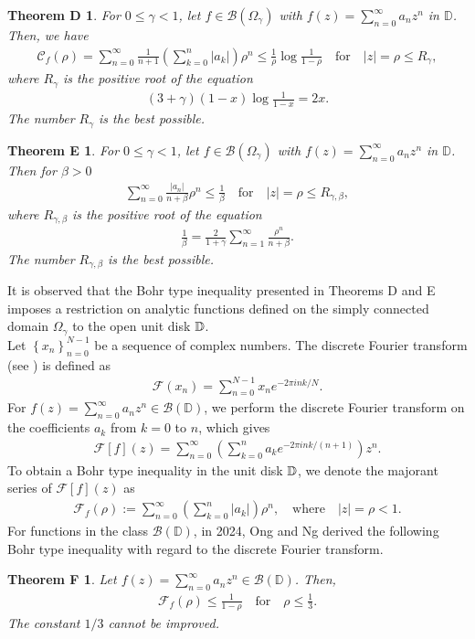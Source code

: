 \documentclass[11pt,reqno]{amsart}
\newtheorem*{theoD}{Theorem D}
\newtheorem*{theoE}{Theorem E}
\newtheorem*{theoF}{Theorem F}
\newtheorem{open problem}{Open problem}[section]
\newcommand{\beas}{\begin{eqnarray*}}
\newcommand{\eeas}{\end{eqnarray*}}
\numberwithin{equation}{section}
\begin{document}
\begin{theoD}\cite{5}
For $0\leq \gamma<1$, let  $f\in\mathcal{B}(\Omega_{\gamma})$ with $f(z)=\sum_{n=0}^\infty a_n z^n$ in $\mathbb{D}$. Then, we have 
\beas \mathcal{C}_f(\rho)=\sum_{n=0}^\infty \frac{1}{n+1}\left(\sum_{k=0}^n |a_k|\right) \rho^n\leq \frac{1}{\rho}\log\frac{1}{1-\rho}\quad\text{for}\quad |z|=\rho\leq R_\gamma,\eeas
where $R_\gamma$ is the positive root of the equation 
\beas (3+\gamma)(1-x)\log\frac{1}{1-x}=2x.\eeas 
The number $R_\gamma$ is the best possible. \end{theoD}
\begin{theoE}\cite{5}
For $0\leq \gamma<1$, let  $f\in\mathcal{B}(\Omega_{\gamma})$ with $f(z)=\sum_{n=0}^\infty a_n z^n$ in $\mathbb{D}$. Then for $\beta>0$
\beas \sum_{n=0}^\infty \frac{|a_n|}{n+\beta}\rho^n\leq \frac{1}{\beta}\quad\text{for}\quad |z|=\rho\leq R_{\gamma,\beta},\eeas
where $R_{\gamma,\beta}$ is the positive root of the equation 
\beas\frac{1}{\beta}=\frac{2}{1+\gamma}\sum_{n=1}^\infty \frac{\rho^n}{n+\beta}.\eeas 
The number $R_{\gamma,\beta}$ is the best possible.
\end{theoE}
It is observed that the Bohr type inequality presented in \textrm{Theorems D} and \textrm{E} imposes a restriction on analytic functions defined on the simply connected domain 
$\Omega_{\gamma}$ to the open unit disk $\Bbb{D}$.\\[2mm]
\indent Let $\left\{x_n\right\}_{n=0}^{N-1}$ be a sequence of complex numbers. The discrete Fourier transform (see \cite[Chapter 6]{100}) is defined as 
\beas \mathcal{F}(x_n)=\sum_{n=0}^{N-1} x_n e^{-2\pi i n k/N}. \eeas 
For $f(z)=\sum_{n=0}^\infty a_n z^n\in\mathcal{B}(\mathbb{D})$, we perform the discrete Fourier transform on the coefficients $a_k$ from $k=0$ to $n$, which gives
\beas \mathcal{F}[f](z)=\sum_{n=0}^\infty \left(\sum_{k=0}^n a_k e^{-2\pi i n k/(n+1)}\right) z^n.\eeas
To obtain a Bohr type inequality in the unit disk $\Bbb{D}$, we denote the majorant series of $\mathcal{F}[f](z)$ as
\beas \mathcal{F}_f(\rho):=\sum_{n=0}^\infty \left(\sum_{k=0}^n |a_k|\right) \rho^n, \quad\text{where}\quad |z|=\rho<1.\eeas
For functions in the class $\mathcal{B}(\mathbb{D})$, in 2024, Ong and Ng \cite{101} derived the following Bohr type inequality with regard to the discrete Fourier transform.
\begin{theoF}\cite{101}
Let $f(z)=\sum_{n=0}^\infty a_n z^n\in\mathcal{B}(\mathbb{D})$. Then, 
\beas \mathcal{F}_f(\rho)\leq \frac{1}{1-\rho}\quad\text{for}\quad \rho\leq \frac{1}{3}.\eeas
The constant $1/3$ cannot be improved.
\end{theoF}
\end{document}
